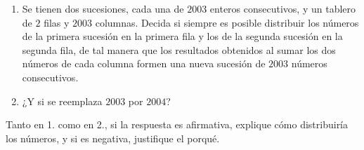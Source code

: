  \begin{enumerate} 
   \item  Se tienen dos sucesiones, cada una de $2003$ enteros consecutivos, y un tablero de $2$ filas y $2003$ columnas. Decida si siempre es posible distribuir los números de la primera sucesión en la primera fila y los de la segunda sucesión en la segunda fila, de tal manera que los resultados obtenidos al sumar los dos números de cada columna formen una nueva sucesión de $2003$ números consecutivos.
   \item  ¿Y si se reemplaza $2003$ por $2004$?
 \end{enumerate} 
Tanto en 1. como en 2., si la respuesta es afirmativa, explique cómo distribuiría los números, y si es negativa, justifique el porqué.
